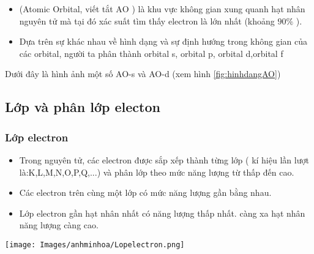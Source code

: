 \begin{dngsnd}
	\begin{itemize}
		\item {} (Atomic Orbital, viết tắt $\mathrm{AO}$ ) là khu vực không gian xung quanh hạt nhân nguyên tử mà tại đó xác suất tìm thấy electron là lớn nhất (khoảng $90 \%$ ).
		\item Dựa trên sự khác nhau  về hình dạng và sự định hướng trong không gian của các orbital, người ta phân thành orbital s, orbital p, orbital d,orbital f
	\end{itemize}
\end{dngsnd}
Dưới đây là hình ảnh một số AO-s và AO-d (xem hình \ref{fig:hinhdangAO})\\
\label{fig:hinhdangAO}
\subsection{Lớp và phân lớp electon}
\subsubsection{Lớp electron}

\begin{hoplythuyet}
	\begin{itemize}
	\item Trong nguyên tử, các electron được sắp xếp thành từng lớp ( kí hiệu lần lượt là:K,L,M,N,O,P,Q,...) và phân lớp theo mức năng lượng từ thấp đến cao.
	\item Các electron trên cùng  một lớp có mức năng lượng gần bằng nhau.
	\item Lớp electron gần hạt nhân nhất có năng lượng thấp nhất. càng xa hạt nhân năng lượng càng cao.
\end{itemize}
\end{hoplythuyet}
\begin{center}
	\texttt{[image: Images/anhminhoa/Lopelectron.png]}
\end{center}
